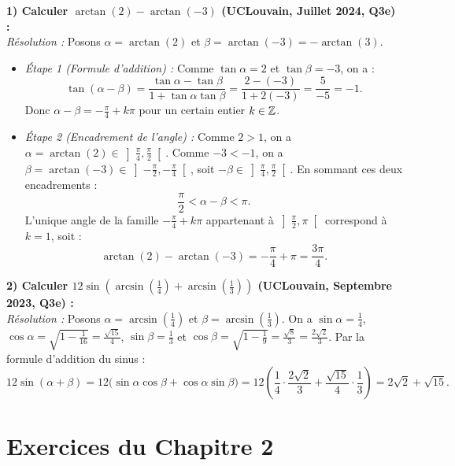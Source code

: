\begin{exemple}
\textbf{1) Calculer $\arctan(2) - \arctan(-3)$ (UCLouvain, Juillet 2024, Q3e) :}\\
\emph{Résolution :} Posons $\alpha = \arctan(2)$ et $\beta = \arctan(-3) = -\arctan(3)$.
\begin{itemize}
    \item \emph{Étape 1 (Formule d'addition) :} Comme $\tan\alpha = 2$ et $\tan\beta = -3$, on a :
    \[
        \tan(\alpha - \beta) = \frac{\tan\alpha - \tan\beta}{1 + \tan\alpha\tan\beta} = \frac{2 - (-3)}{1 + 2(-3)} = \frac{5}{-5} = -1.
    \]
    Donc $\alpha - \beta = -\frac{\pi}{4} + k\pi$ pour un certain entier $k \in \mathbb{Z}$.
    \item \emph{Étape 2 (Encadrement de l'angle) :} Comme $2 > 1$, on a $\alpha = \arctan(2) \in \left]\frac{\pi}{4}, \frac{\pi}{2}\right[$. Comme $-3 < -1$, on a $\beta = \arctan(-3) \in \left]-\frac{\pi}{2}, -\frac{\pi}{4}\right[$, soit $-\beta \in \left]\frac{\pi}{4}, \frac{\pi}{2}\right[$. En sommant ces deux encadrements :
    \[
        \frac{\pi}{2} < \alpha - \beta < \pi.
    \]
    L'unique angle de la famille $-\frac{\pi}{4} + k\pi$ appartenant à $\left]\frac{\pi}{2}, \pi\right[$ correspond à $k=1$, soit :
    \[
        \arctan(2) - \arctan(-3) = -\frac{\pi}{4} + \pi = \boxed{\frac{3\pi}{4}}.
    \]
\end{itemize}

\medskip
\textbf{2) Calculer $12\sin\left(\arcsin\left(\frac{1}{4}\right) + \arcsin\left(\frac{1}{3}\right)\right)$ (UCLouvain, Septembre 2023, Q3e) :}\\
\emph{Résolution :} Posons $\alpha = \arcsin\left(\frac{1}{4}\right)$ et $\beta = \arcsin\left(\frac{1}{3}\right)$. On a $\sin\alpha = \frac{1}{4}$, $\cos\alpha = \sqrt{1 - \frac{1}{16}} = \frac{\sqrt{15}}{4}$, $\sin\beta = \frac{1}{3}$ et $\cos\beta = \sqrt{1 - \frac{1}{9}} = \frac{\sqrt{8}}{3} = \frac{2\sqrt{2}}{3}$. Par la formule d'addition du sinus :
\[
    12\sin(\alpha + \beta) = 12\bigl(\sin\alpha\cos\beta + \cos\alpha\sin\beta\bigr) = 12\left(\frac{1}{4}\cdot\frac{2\sqrt{2}}{3} + \frac{\sqrt{15}}{4}\cdot\frac{1}{3}\right) = \boxed{2\sqrt{2} + \sqrt{15}}.
\]
\end{exemple}

\section{Exercices du Chapitre 2}

